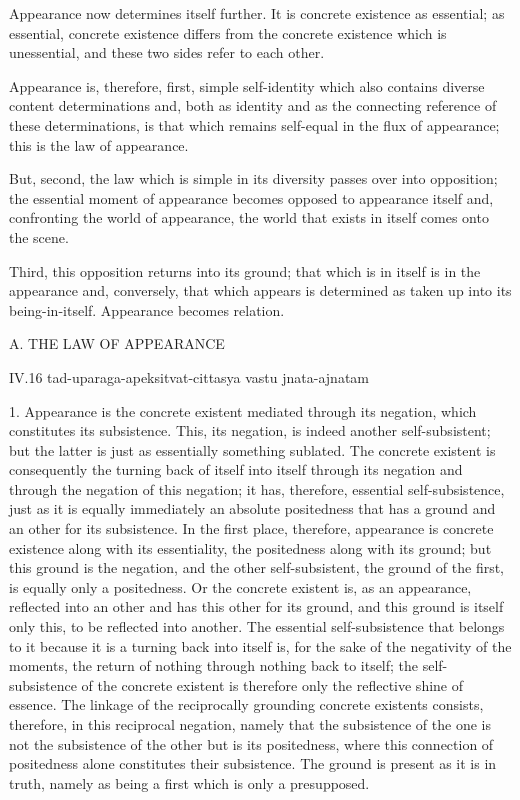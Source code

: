 Appearance now determines itself further.
It is concrete existence as essential;
as essential, concrete existence differs
from the concrete existence which is unessential,
and these two sides refer to each other.

Appearance is, therefore, first, simple self-identity
which also contains diverse content determinations
and, both as identity and as the connecting reference
of these determinations,
is that which remains self-equal
in the flux of appearance;
this is the law of appearance.

But, second, the law which is simple in its diversity
passes over into opposition;
the essential moment of appearance becomes
opposed to appearance itself
and, confronting the world of appearance,
the world that exists in itself comes onto the scene.

Third, this opposition returns into its ground;
that which is in itself is in the appearance
and, conversely, that which appears is determined
as taken up into its being-in-itself.
Appearance becomes relation.

A. THE LAW OF APPEARANCE

IV.16
tad-uparaga-apeksitvat-cittasya vastu jnata-ajnatam

1. Appearance is the concrete existent mediated through its negation,
which constitutes its subsistence.
This, its negation, is indeed another self-subsistent;
but the latter is just as essentially something sublated.
The concrete existent is consequently the turning back
of itself into itself through its negation
and through the negation of this negation;
it has, therefore, essential self-subsistence,
just as it is equally immediately an absolute positedness
that has a ground and an other for its subsistence.
In the first place, therefore, appearance is
concrete existence along with its essentiality,
the positedness along with its ground;
but this ground is the negation, and the other self-subsistent,
the ground of the first, is equally only a positedness.
Or the concrete existent is, as an appearance,
reflected into an other and has this other for its ground,
and this ground is itself only this, to be reflected into another.
The essential self-subsistence that belongs to it because it is a
turning back into itself is, for the sake of the negativity of the moments,
the return of nothing through nothing back to itself;
the self-subsistence of the concrete existent is
therefore only the reflective shine of essence.
The linkage of the reciprocally grounding concrete existents consists,
therefore, in this reciprocal negation,
namely that the subsistence of the one is not
the subsistence of the other but is its positedness,
where this connection of positedness alone constitutes their subsistence.
The ground is present as it is in truth,
namely as being a first which is only a presupposed.

